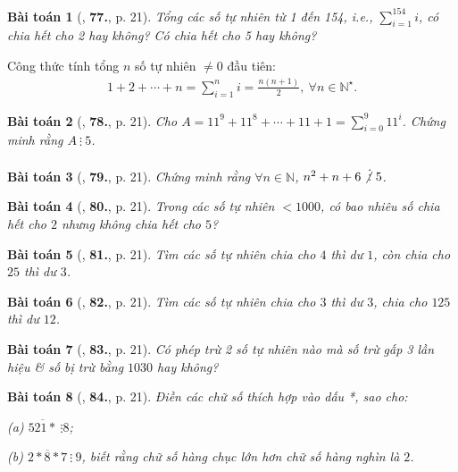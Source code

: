 \documentclass{article}
\numberwithin{equation}{section}
\newtheorem{baitoan}{Bài toán}[section]
\begin{document}
\begin{baitoan}[\cite{Binh_Toan_6_tap_1}, \textbf{77.}, p. 21]
	Tổng các số tự nhiên từ 1 đến 154, i.e., $\sum_{i=1}^{154} i$, có chia hết cho 2 hay không? Có chia hết cho 5 hay không?
\end{baitoan}
Công thức tính tổng $n$ số tự nhiên $\ne 0$ đầu tiên:
\begin{align*}
	\boxed{1 + 2 + \cdots + n = \sum_{i=1}^n i = \frac{n(n + 1)}{2},\ \forall n\in\mathbb{N}^\star.}
\end{align*}

\begin{baitoan}[\cite{Binh_Toan_6_tap_1}, \textbf{78.}, p. 21]
	Cho $A = 11^9 + 11^8 + \cdots + 11 + 1 = \sum_{i=0}^9 11^i$. Chứng minh rằng $A\ \vdots\ 5$.
\end{baitoan}

\begin{baitoan}[\cite{Binh_Toan_6_tap_1}, \textbf{79.}, p. 21]
	Chứng minh rằng $\forall n\in\mathbb{N}$, $n^2 + n + 6\not\vdots\ 5$.
\end{baitoan}

\begin{baitoan}[\cite{Binh_Toan_6_tap_1}, \textbf{80.}, p. 21]
	Trong các số tự nhiên $< 1000$, có bao nhiêu số chia hết cho $2$ nhưng không chia hết cho $5$?
\end{baitoan}

\begin{baitoan}[\cite{Binh_Toan_6_tap_1}, \textbf{81.}, p. 21]
	Tìm các số tự nhiên chia cho $4$ thì dư $1$, còn chia cho $25$ thì dư $3$.
\end{baitoan}

\begin{baitoan}[\cite{Binh_Toan_6_tap_1}, \textbf{82.}, p. 21]
	Tìm các số tự nhiên chia cho $3$ thì dư $3$, chia cho $125$ thì dư $12$.
\end{baitoan}

\begin{baitoan}[\cite{Binh_Toan_6_tap_1}, \textbf{83.}, p. 21]
	Có phép trừ 2 số tự nhiên nào mà số trừ gấp 3 lần hiệu \& số bị trừ bằng $1030$ hay không?
\end{baitoan}

\begin{baitoan}[\cite{Binh_Toan_6_tap_1}, \textbf{84.}, p. 21]
	Điền các chữ số thích hợp vào dấu *, sao cho:
	\begin{enumerate*}
		\item[(a)] $\overline{521*}\ \vdots 8$;
		\item[(b)] $\overline{2*8*7}\ \vdots\ 9$, biết rằng chữ số hàng chục lớn hơn chữ số hàng nghìn là $2$.
	\end{enumerate*}
\end{baitoan}
\end{document}
